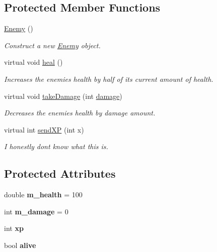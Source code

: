 \subsection*{Protected Member Functions}
\begin{DoxyCompactItemize}
\item 
\mbox{\hyperlink{classEnemy_a94f30d348b6d2840fd71675472ba38dd}{Enemy}} ()
\begin{DoxyCompactList}\small\item\em Construct a new \mbox{\hyperlink{classEnemy}{Enemy}} object. \end{DoxyCompactList}\item 
virtual void \mbox{\hyperlink{classEnemy_a5f7ddbe448758f4a8eef7d846903ce99}{heal}} ()
\begin{DoxyCompactList}\small\item\em Increases the enemies health by half of it\textquotesingle{}s current amount of health. \end{DoxyCompactList}\item 
virtual void \mbox{\hyperlink{classEnemy_ae01c62a474fbcd547000ff1068976d49}{take\+Damage}} (int \mbox{\hyperlink{classRose_1_1Character_1_1Actor_a8d835beb192c864967c7a9b3a5f7f579}{damage}})
\begin{DoxyCompactList}\small\item\em Decreases the enemies health by damage amount. \end{DoxyCompactList}\item 
virtual int \mbox{\hyperlink{classEnemy_a755e7d44eb291517f28e9cad2c6c7111}{send\+XP}} (int x)
\begin{DoxyCompactList}\small\item\em I honestly don\textquotesingle{}t know what this is. \end{DoxyCompactList}\end{DoxyCompactItemize}
\subsection*{Protected Attributes}
\begin{DoxyCompactItemize}
\item 
\mbox{\label{classEnemy_af7da86e74d41308bc6378bf0223a5fb5}} 
double {\bfseries m\+\_\+health} = 100
\item 
\mbox{\label{classEnemy_a2fbf89783c994b155b825563a6c51fc5}} 
int {\bfseries m\+\_\+damage} = 0
\item 
\mbox{\label{classEnemy_a6c93c0e43d21c5198797b386b6140848}} 
int {\bfseries xp}
\item 
\mbox{\label{classEnemy_a26c34811424e665a6c2efb9100cae0d8}} 
bool {\bfseries alive}
\end{DoxyCompactItemize}
